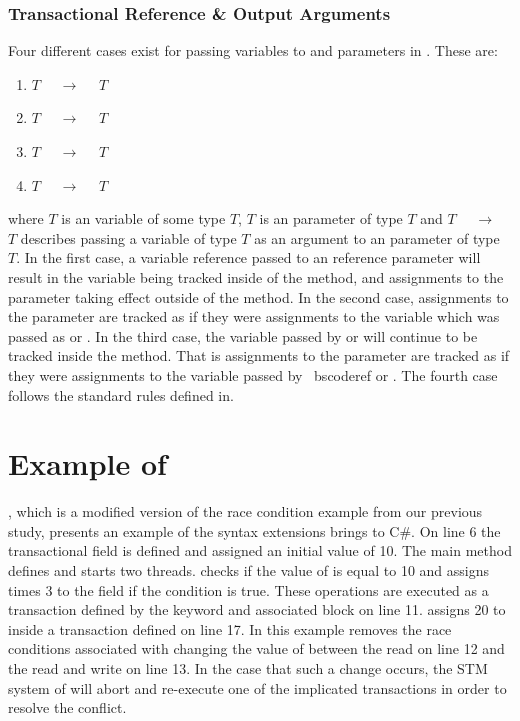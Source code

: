 \subsubsection{Transactional Reference \& Output Arguments}\label{subsubsec:trans_ref_out_args}
Four different cases exist for passing variables to  and  parameters in \stmname. These are:
\begin{enumerate}
	\item $T$ $\quad \rightarrow \quad$  $T$
	\item {} $T$ $\quad \rightarrow\quad$ $T$
	\item {} $T$ $\quad \rightarrow\quad$  $T$
	\item $T$ $\quad \rightarrow \quad$ $T$
\end{enumerate}
where $T$ is an variable of some type $T$,  $T$ is an  parameter of type $T$ and $T$ $\quad \rightarrow \quad$  $T$ describes passing a variable of type $T$ as an argument to an  parameter of type $T$. In the first case, a variable reference passed to an  reference parameter will result in the variable being tracked inside of the method, and assignments to the parameter taking effect outside of the method. In the second case, assignments to the parameter are tracked as if they were assignments to the variable which was passed as  or . In the third case, the variable passed by  or  will continue to be tracked inside the method. That is assignments to the parameter are tracked as if they were assignments to the variable passed by \ bscode{ref} or . The fourth case follows the standard rules defined in\cite[p. 145]{csharp2013specificaiton}.

\section{Example of \stmnamesp}\label{sec:example_design}
, which is a modified version of the race condition example from our previous study\cite[p. 23]{dpt907e14trending}, presents an example of the syntax extensions \stmnamesp brings to C\#. On line 6 the transactional field  is defined and assigned an initial value of 10. The main method defines and starts two threads.  checks if the value of  is equal to 10 and assigns  times 3 to the field if the condition is true. These operations are executed as a transaction defined by the  keyword and associated block on line 11.  assigns 20 to  inside a transaction defined on line 17. In this example \stmnamesp removes the race conditions associated with  changing the value of  between the read on line 12 and the read and write on line 13. In the case that such a change occurs, the \ac{STM} system of \stmnamesp will abort and re-execute one of the implicated transactions in order to resolve the conflict.

